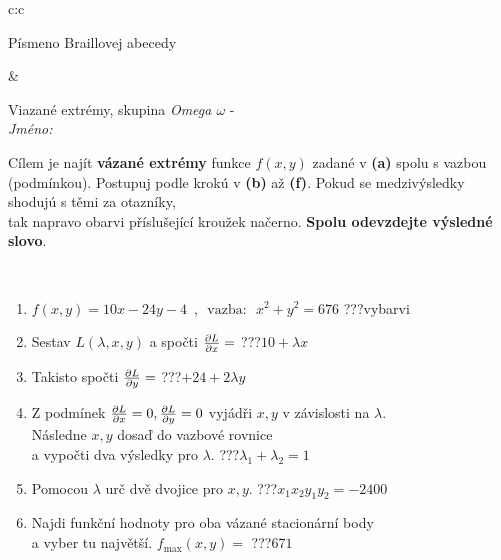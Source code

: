 \documentclass[10pt]{report}
\begin{document}
\begin{tabular}{c:c}
\begin{minipage}[c][104.5mm][t]{0.5\linewidth}
\begin{center}
\begin{minipage}{0.20\linewidth}
\begin{center}
{\small Písmeno Braillovej abecedy}
\end{center}
\end{minipage}
\end{center}
\end{minipage}
&
\begin{minipage}[c][104.5mm][t]{0.5\linewidth}
\begin{center}
\vspace{7mm}
{\huge Viazané extrémy, skupina \textit{Omega $\omega$} -}\\[5mm]
\textit{Jméno:}\phantom{xxxxxxxxxxxxxxxxxxxxxxxxxxxxxxxxxxxxxxxxxxxxxxxxxxxxxxxxxxxxxxxxx}\\[5mm]
\begin{minipage}{0.95\linewidth}
\begin{center}
Cílem je najít \textbf{vázané extrémy} funkce $f(x,y)$ zadané v \textbf{(a)} spolu s vazbou (podmínkou). Postupuj podle krokú v \textbf{(b)} až \textbf{(f)}. Pokud se medzivýsledky shodujú s těmi za otazníky,\\tak napravo obarvi příslušející kroužek načerno. \textbf{Spolu odevzdejte výsledné slovo}.
\end{center}
\end{minipage}
\\[1mm]
\begin{minipage}{0.79\linewidth}
\begin{center}
\begin{varwidth}{\linewidth}
\begin{enumerate}
\normalsize
\item $f(x,y)=10x-24y-4 \enspace , \enspace \mathrm{vazba:} \enspace x^2+y^2=676$\quad \dotfill\; ???\;\dotfill \quad vybarvi
\item Sestav $L(\lambda,x,y)$ a spočti $\pdv{L}{x}=$\quad \dotfill\; ???\;\dotfill \quad $10+\lambda x$
\item Takisto spočti $\pdv{L}{y}=$\quad \dotfill\; ???\;\dotfill \quad $+24+2\lambda y$
\item Z podmínek $\pdv{L}{x}=0 , \pdv{L}{y}=0$ vyjádři $x,y$ v závislosti na $\lambda$.\\ \phantom{xxxxxx}Následne $x,y$ dosaď do vazbové rovnice\\ \phantom{xxxxxx}a vypočti dva výsledky pro $\lambda$.\quad \dotfill\; ???\;\dotfill \quad $\lambda_1+\lambda_2=1$
\item Pomocou $\lambda$ urč dvě dvojice pro $x,y$.\quad \dotfill\; ???\;\dotfill \quad $x_1 x_2 y_1 y_2=-2400$
\item Najdi funkční hodnoty pro oba vázané stacionární body\\ \phantom{xxxxxx}a vyber tu najvětší. $f_{\text{max}}(x,y)=$\quad \dotfill\; ???\;\dotfill \quad $671$

\end{enumerate}
\end{varwidth}
\end{center}
\end{minipage}
\end{center}
\end{minipage}
\end{tabular}
\end{document}
